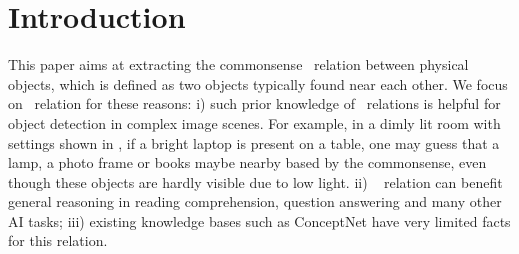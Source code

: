 \section{Introduction}
%
This paper aims at extracting the commonsense \lnear\ relation between
physical objects, which is defined as two objects typically found 
near each other.
We focus on \lnear\ relation for these reasons: 
i) such prior knowledge of \lnear\ relations is helpful for 
object detection in complex image 
scenes. 
For example, in a dimly lit room with settings shown in , 
if a bright laptop is present on a table,
one may guess that a lamp, a photo frame or books maybe nearby 
based by the commonsense, 
even though these objects are hardly visible due to low light. 
ii) \lnear~ relation can benefit general reasoning in reading comprehension,
question answering and many other AI tasks;
iii) existing knowledge bases such as ConceptNet have very limited facts for
this relation.

